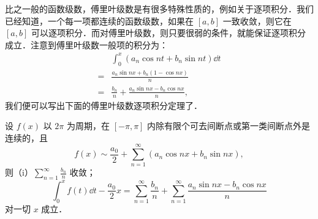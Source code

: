 比之一般的函数级数，傅里叶级数是有很多特殊性质的，例如关于逐项积分．我们已经知道，一个每一项都连续的函数级数，如果在 $[a,b]$ 一致收敛，则它在 $[a,b]$ 可以逐项积分．而对傅里叶级数，则只要很弱的条件，就能保证逐项积分成立．注意到傅里叶级数一般项的积分为：
\[
\begin{aligned}
&\int_{0}^{x}\left(a_{n}\cos nt+b_{n}\sin nt\right)\dd t\\
={}&\frac{a_{n}\sin nx+b_{n}\left(1-\cos nx\right)}{n}\\
={}&\frac{b_{n}}{n}+\frac{a_{n}\sin nx-b_{n}\cos nx}{n},
\end{aligned}
\]
我们便可以写出下面的傅里叶级数逐项积分定理了．

\begin{theorem}\label{thm:14-6}
设 $f(x)$ 以 $2\pi$ 为周期，在 $[-\pi,\pi]$ 内除有限个可去间断点或第一类间断点外是连续的，且
\begin{equation}
f(x)\sim\frac{a_{0}}{2}+\sum_{n=1}^{\infty}\left(a_{n}\cos nx+b_{n}\sin nx\right),
\tag{7}
\end{equation}
则（i）$\displaystyle\sum_{n=1}^{\infty}\frac{b_{n}}{n}$ 收敛；
\begin{equation}
\int_{0}^{x}f(t)\dd t-\frac{a_{0}}{2}x=\sum_{n=1}^{\infty}\frac{b_{n}}{n}+\sum_{n=1}^{\infty}\frac{a_{n}\sin nx-b_{n}\cos nx}{n}
\tag{8}
\end{equation}
对一切 $x$ 成立．
\end{theorem}


